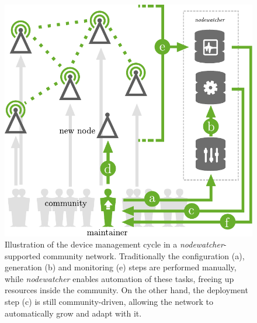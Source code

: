 \documentclass[5p,sort&compress]{elsarticle}
\newcommand{\nodewatcher}{\textit{nodewatcher}}
\begin{document}
\begin{figure}
  \centering
  \includegraphics[width=\columnwidth]{figures/device-mgmt-cycle.pdf}
  \caption{Illustration of the device management cycle in a \nodewatcher{}-supported community network. Traditionally the configuration (a), generation (b) and monitoring (e) steps are performed manually, while \nodewatcher{} enables automation of these tasks, freeing up resources inside the community. On the other hand, the deployment step (c) is still community-driven, allowing the network to automatically grow and adapt with it.}
  \label{fig:device-mgmt-cycle}
\end{figure}
\end{document}

